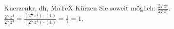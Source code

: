 \begin{MAufgabe}{Kuerzen}{kr, dh, MaTeX}
K\"urzen Sie soweit m\"oglich: $\frac{27\, z^4}{27\, z^4}$.\\ 
\ifLsg\MLoesung
\quad $\frac{27\, z^4}{27\, z^4}=\frac{(27\, z^4)\cdot(1)}{(27\, z^4)\cdot(1)}=\frac{1}{1}=1$.\else\relax\fi
 \end{MAufgabe}